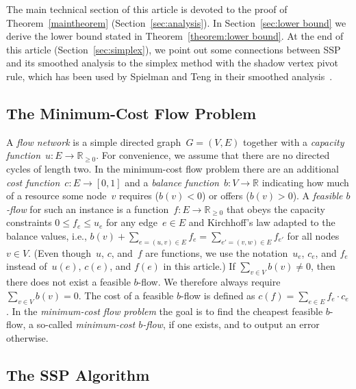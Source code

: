 \documentclass[11pt]{article}
\newcommand{\RR}{\mathbb{R}}
\begin{document}
The main technical section of this article is devoted to the proof of Theorem~\ref{maintheorem}
(Section~\ref{sec:analysis}). In Section~\ref{sec:lower bound} we derive the lower bound stated in Theorem~\ref{theorem:lower bound}.
At the end of this article (Section~\ref{sec:simplex}), we point out
some connections between SSP and its smoothed analysis
to the simplex method with the shadow vertex pivot rule, which has been used
by Spielman and Teng in their smoothed analysis~\cite{DBLP:journals/jacm/SpielmanT04}.

\subsection{The Minimum-Cost Flow Problem}

A \emph{flow network} is a simple directed graph~$G = (V, E)$ together with a \emph{capacity function}~$u \colon E \to \RR_{\geq 0}$. For convenience, we assume that there are no directed cycles of length two. In the minimum-cost flow problem there are an additional \emph{cost function}~$c \colon E \to [0, 1]$ and a \emph{balance function}~$b \colon V \to \RR$ indicating how much of a resource some node~$v$ requires ($b(v) < 0$) or offers ($b(v) > 0$). A \emph{feasible $b$-flow} for such an instance is a function~$f \colon E \to \RR_{\geq 0}$ that obeys the capacity constraints $0 \leq f_e \leq u_e$ for any edge~$e \in E$ and Kirchhoff's law adapted to the balance values, i.e.,
$
  b(v) + \sum_{e = (u, v) \in E} f_e = \sum_{e' = (v, w) \in E} f_{e'}
$
for all nodes $v \in V$. (Even though~$u$, $c$, and~$f$ are functions, we use the notation~$u_e$, $c_e$, and $f_e$ instead of~$u(e)$, $c(e)$, and $f(e)$ in this article.) If $\sum_{v \in V} b(v) \neq 0$, then there does not exist a feasible $b$-flow. We therefore always require $\sum_{v \in V} b(v) = 0$.
The cost of a feasible $b$-flow is defined as $c(f) = \sum_{e \in E} f_e \cdot c_e$. In the \emph{minimum-cost flow problem} the goal is to find the cheapest feasible $b$-flow, a so-called \emph{minimum-cost $b$-flow}, if one exists, and to output an error otherwise.

 
\subsection{The SSP Algorithm}
\label{sec:SSPAlg}
\end{document}
